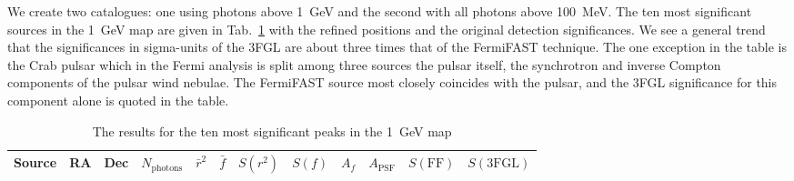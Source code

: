 \documentclass[useAMS,usenatbib]{mn2e}
\begin{document}
We create two catalogues: one using photons above 1~GeV and the second
with all photons above 100~MeV.  The ten most significant sources in
the 1~GeV map are given in Tab.~\ref{tab:topten} with the refined
positions and the original detection significances.  We see a general
trend that the significances in sigma-units of the 3FGL are about
three times that of the FermiFAST technique.  The one exception in the
table is the Crab pulsar which in the Fermi analysis is split among
three sources the pulsar itself, the synchrotron and inverse Compton
components of the pulsar wind nebulae.  The FermiFAST source most
closely coincides with the pulsar, and the 3FGL significance for this
component alone is quoted in the table.
\begin{table}
  \caption{The results for the ten most significant peaks in the 1~GeV map}
  \label{tab:topten}
  \begin{tabular}{lrrrrrrrrrrr}
    \hline
     Source & \multicolumn{1}{c}{RA} & \multicolumn{1}{c}{Dec}  & \multicolumn{1}{c}{$N_\mathrm{photons}$}  &\multicolumn{1}{c}{$\bar r^2$} & \multicolumn{1}{c}{$\bar f$} & \multicolumn{1}{c}{$S(r^2)$} & \multicolumn{1}{c}{$S(f)$} & \multicolumn{1}{c}{$A_f$}  & \multicolumn{1}{c}{$A_\mathrm{PSF}$} & \multicolumn{1}{c}{$S(\mathrm{FF})$} & \multicolumn{1}{c}{$S(\mathrm{3FGL})$} \\
    \hline


\end{tabular}
\end{table}
\end{document}

